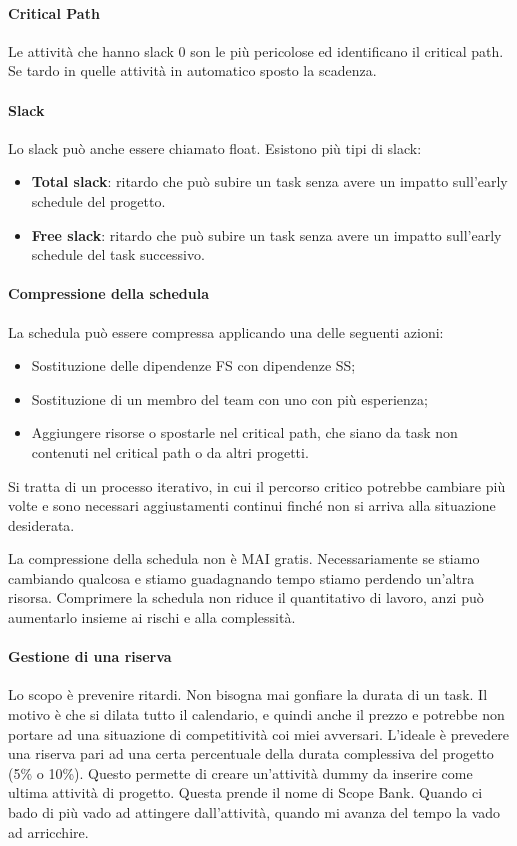 \paragraph{Critical Path}
Le attività che hanno slack 0 son le più pericolose ed identificano il critical path. Se tardo in quelle attività in automatico sposto la scadenza.
\paragraph{Slack}
Lo slack può anche essere chiamato float. Esistono più tipi di slack:
\begin{itemize}
	\item \textbf{Total slack}: ritardo che può subire un task senza avere un impatto sull'early schedule del progetto.
	\item \textbf{Free slack}: ritardo che può subire un task senza avere un impatto sull'early schedule del task successivo.
\end{itemize}

\paragraph{Compressione della schedula}
La schedula può essere compressa applicando una delle seguenti azioni:
\begin{itemize}
	\item Sostituzione delle dipendenze FS con dipendenze SS;
	\item Sostituzione di un membro del team con uno con più esperienza;
	\item Aggiungere risorse o spostarle nel critical path, che siano da task non contenuti nel critical path o da altri progetti.
\end{itemize}
Si tratta di un processo iterativo, in cui il percorso critico potrebbe cambiare più volte e sono necessari aggiustamenti continui finché non si arriva alla situazione desiderata.

\noindent La compressione della schedula non è MAI gratis. Necessariamente se stiamo cambiando qualcosa e stiamo guadagnando tempo stiamo perdendo un'altra risorsa. Comprimere la schedula non riduce il quantitativo di lavoro, anzi può aumentarlo insieme ai rischi e alla complessità.

\paragraph{Gestione di una riserva}
Lo scopo è prevenire ritardi. Non bisogna mai gonfiare la durata di un task. Il motivo è che si dilata tutto il calendario, e quindi anche il prezzo e potrebbe non portare ad una situazione di competitività coi miei avversari. L'ideale è prevedere una riserva pari ad una certa percentuale della durata complessiva del progetto (5\% o 10\%). Questo permette di creare un'attività dummy da inserire come ultima attività di progetto. Questa prende il nome di Scope Bank. Quando ci bado di più vado ad attingere dall'attività, quando mi avanza del tempo la vado ad arricchire.

